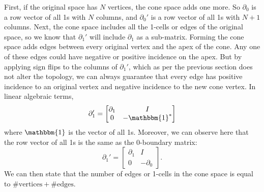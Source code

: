 \documentclass[twocolumn]{article}
\begin{document}
First, if the original space has $N$ vertices, the cone space adds one more.
So $\partial_0$ is a row vector of all 1s with $N$ columns, and $\partial_0'$ is a row vector of all 1s with $N + 1$ columns.
Next, the cone space includes all the 1-cells or edges of the original space, so we know that $\partial_1'$ will include $\partial_1$ as a sub-matrix.
Forming the cone space adds edges between every original vertex and the apex of the cone.
Any one of these edges could have negative or positive incidence on the apex.
But by applying sign flips to the columns of $\partial_1'$, which as per the previous section does not alter the topology, we can always guarantee that every edge has positive incidence to an original vertex and negative incidence to the new cone vertex.
In linear algebraic terms,
\begin{equation}
    \partial_1' = \left[\begin{matrix}\partial_1 & I \\ 0 & -\mathbbm{1}^*\end{matrix}\right]
\end{equation}
where $\mathbbm{1}$ is the vector of all 1s.
Moreover, we can observe here that the row vector of all 1s is the same as the 0-boundary matrix:
\begin{equation}
    \partial_1' = \left[\begin{matrix}\partial_1 & I \\ 0 & -\partial_0\end{matrix}\right].
    \label{eq:cone-partial1}
\end{equation}
We can then state that the number of edges or 1-cells in the cone space is equal to $\#\text{vertices} + \#\text{edges}$.
\end{document}
